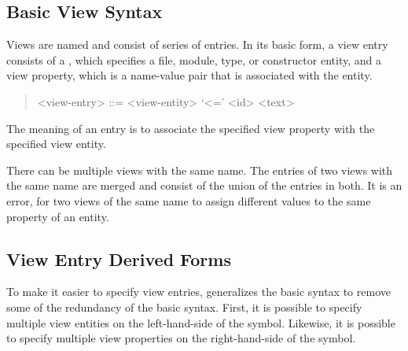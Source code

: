 \subsection{Basic View Syntax}
Views are named and consist of series of entries.
In its basic form, a view entry consists of a , which specifies a file, module,
type, or constructor entity, and a view property, which is a name-value pair that is associated with
the entity.
%
\begin{quote}\begin{grammar}
  <view-entry>  ::= <view-entity> `<=' <id> <text>
\end{grammar}\end{quote}%
%
The meaning of an entry is to associate the specified view property with the specified view entity.
%

There can be multiple views with the same name.
The entries of two views with the same name are merged and consist of the
union of the entries in both.
It is an error, for two views of the same name to assign different values
to the same property of an entity.

\subsection{View Entry Derived Forms}
To make it easier to specify view entries, \asdl{} generalizes the basic syntax
to remove some of the redundancy of the basic syntax.
First, it is possible to specify multiple view entities on the left-hand-side of
the \lit{<=} symbol.
Likewise, it is possible to specify multiple view properties on the right-hand-side
of the \lit{<=} symbol.

